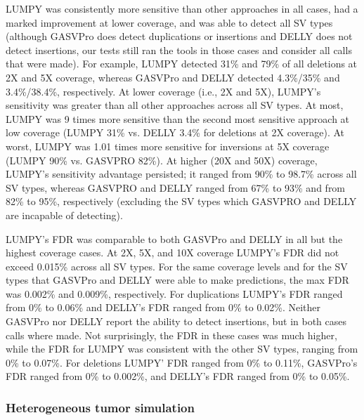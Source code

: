 \documentclass[10pt]{bmc_article}
\newenvironment{bmcformat}{\begin{raggedright}\baselineskip20pt\sloppy\setboolean{publ}{false}}{\end{raggedright}\baselineskip20pt\sloppy}
\begin{document}
\begin{bmcformat}
LUMPY was consistently more sensitive than other approaches in all cases, had a
marked improvement at lower coverage, and was able to detect all SV types
(although GASVPro does detect duplications or insertions and DELLY does not
detect insertions, our tests still ran the tools in those cases and consider
all calls that were made).  For example, LUMPY detected 31\% and 79\% of all
deletions at 2X and 5X coverage, whereas GASVPro and DELLY detected 4.3\%/35\%
and 3.4\%/38.4\%, respectively.  At lower coverage (i.e., 2X and 5X), LUMPY’s
sensitivity was greater than all other approaches across all SV types. At most,
LUMPY was 9 times more sensitive than the second most sensitive approach at low
coverage (LUMPY 31\% vs. DELLY 3.4\% for deletions at 2X coverage). At worst,
LUMPY was 1.01 times more sensitive for inversions at 5X coverage (LUMPY 90\%
vs.  GASVPRO 82\%). At higher (20X and 50X) coverage, LUMPY’s sensitivity
advantage persisted; it ranged from 90\% to 98.7\% across all SV types, whereas
GASVPRO and DELLY ranged from 67\% to 93\% and from 82\% to 95\%, respectively
(excluding the SV types which GASVPRO and DELLY are incapable of detecting).  

LUMPY’s FDR was comparable to both GASVPro and DELLY in all but the highest
coverage cases.   At 2X, 5X, and 10X coverage LUMPY’s FDR did not exceed
0.015\% across all SV types.  For the same coverage levels and for the SV types
that GASVPro and DELLY were able to make predictions, the max FDR was 0.002\%
and 0.009\%, respectively.  For duplications LUMPY’s FDR ranged from 0\% to
0.06\% and DELLY’s FDR ranged from 0\% to 0.02\%.  Neither GASVPro nor DELLY
report the ability to detect insertions, but in both cases calls where made.
Not surprisingly, the FDR in these cases was much higher, while the FDR for
LUMPY was consistent with the other SV types, ranging from 0\% to 0.07\%.  For
deletions LUMPY’ FDR ranged from 0\% to 0.11\%, GASVPro’s FDR ranged from 0\%
to 0.002\%, and DELLY’s FDR ranged from 0\% to 0.05\%.

\subsubsection*{Heterogeneous tumor simulation}


\end{bmcformat}
\end{document}

